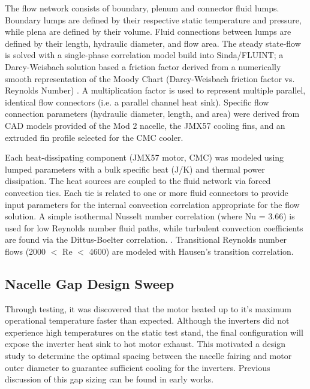 \documentclass[]{aiaa-tc}%
\begin{document}
The flow network consists of boundary, plenum and connector fluid lumps.  Boundary lumps are defined by their respective static temperature and pressure, while plena are defined by their volume.  Fluid connections between lumps are defined by their length, hydraulic diameter, and flow area.  The steady state-flow is solved with a single-phase correlation model build into Sinda/FLUINT; a Darcy-Weisbach solution based a friction factor derived from a numerically smooth representation of the Moody Chart  (Darcy-Weisbach friction factor vs. Reynolds Number) \cite{CRtech_2013}.  A multiplication factor is used to represent multiple parallel, identical flow connectors (i.e. a parallel channel heat sink).  Specific flow connection parameters (hydraulic diameter, length, and area) were derived from CAD models provided of the Mod 2 nacelle, the JMX57 cooling fins, and an extruded fin profile selected for the CMC cooler.  

Each heat-dissipating component (JMX57 motor, CMC) was modeled using lumped parameters with a bulk specific heat (J/K) and thermal power dissipation.  The heat sources are coupled to the fluid network via forced convection ties.  Each tie is related to one or more fluid connectors to provide input parameters for the internal convection correlation appropriate for the flow solution.  A simple isothermal Nusselt number correlation (where Nu = 3.66) is used for low Reynolds number fluid paths, while turbulent convection coefficients are found via the Dittus-Boelter correlation. \cite{CRtech_2015}.  Transitional Reynolds number flows (2000 $<$ Re $<$ 4600) are modeled with Hausen’s transition correlation. \cite{Kays}


\subsection{Nacelle Gap Design Sweep}

Through testing, it was discovered that the motor heated up to it's maximum operational temperature faster than expected. Although the inverters did not experience high temperatures on the static test stand, the final configuration will expose the inverter heat sink to hot motor exhaust. This motivated a design study to determine the optimal spacing between the nacelle fairing and motor outer diameter to guarantee sufficient cooling for the inverters. Previous discussion of this gap sizing can be found in early works. \cite{Schnulo}
\end{document}
